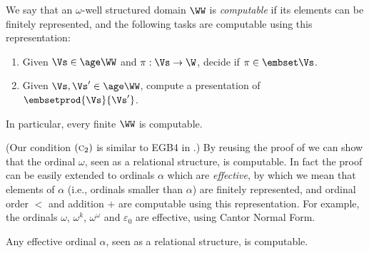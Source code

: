 \newcommand{\CA}[1]{$(\textsc{c}_{#1})$}
%
\begin{sldefinition}\label{def:comp}
We say that an $\omega$-well structured domain $\WW$ 
is \emph{computable} if its elements can be finitely represented,
and the following tasks are computable using this representation:
%
\begin{enumerate}
\item[\CA 1]
Given $\Vs \in \age \WW$ and $\pi:\Vs\to\W$, decide if  $\pi \in \embset \Vs$.
\item[\CA 2]
Given $\Vs, \Vs' \in \age \WW$, compute a presentation of $\embsetprod {\Vs}{\Vs'}$.
\end{enumerate}
In particular, every finite $\WW$ is computable.
\end{sldefinition}
%
(Our condition \CA 2 is similar to EGB4 in \cite{BD11}.)
%
By reusing the proof of \cite[Proposition 3.4]{HKL18} we can show that the ordinal $\omega$, 
seen as a relational structure, is computable.
%
In fact the proof can be easily extended to ordinals $\alpha$ which are \emph{effective},
by which we mean that
elements of $\alpha$ (i.e., ordinals smaller than $\alpha$) are finitely represented, and
ordinal order $<$ and addition $+$ are computable using this representation.
%
For example, the ordinals $\omega$, $\omega^k$, $\omega^{\omega}$ and $\varepsilon_0$ 
are effective, using Cantor Normal Form.
%
\begin{lemmarep} 
Any effective ordinal $\alpha$, seen as a relational structure, is computable.
\end{lemmarep}
%
